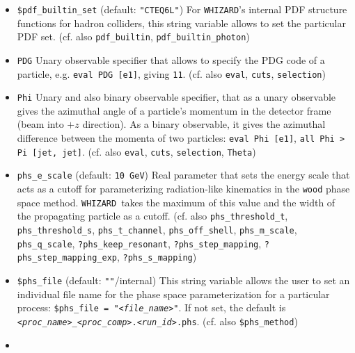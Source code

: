 \documentclass[12pt]{book}
\newcommand{\ttt}[1]{\texttt{#1}}
\newcommand{\whizard}{\texttt{WHIZARD}}
\begin{document}
\begin{itemize}
\ttt{pdf\_builtin\_photon} \newline
This is a beams specifier for \whizard's internal PDF structure
functions to integrate processes in hadron collisions with a photon as
initializer of the hard scattering process.
(cf. \ttt{beams}, \ttt{\$pdf\_builtin\_file}) 
\item
\ttt{\$pdf\_builtin\_set} \qquad (default: \ttt{"CTEQ6L"}) \newline 
For \whizard's internal PDF structure functions for hadron colliders,
this string variable allows to set the particular PDF set. (cf. also
\ttt{pdf\_builtin}, \ttt{pdf\_builtin\_photon})
\item
\ttt{PDG} \newline
Unary observable specifier that allows to specify the PDG code of a
particle, e.g. \ttt{eval PDG [e1]}, giving \ttt{11}. (cf. also
\ttt{eval}, \ttt{cuts}, \ttt{selection})
\item
\ttt{Phi} \newline
Unary and also binary observable specifier, that as a unary observable
gives the azimuthal angle of a particle's momentum in the detector
frame (beam into $+z$ direction). As a binary observable, it gives the
azimuthal difference between the momenta of two particles: \ttt{eval
Phi [e1]},  \ttt{all Phi > Pi [jet, jet]}. (cf. also \ttt{eval},
\ttt{cuts}, \ttt{selection}, \ttt{Theta}) 
\item
\ttt{phs\_e\_scale} \qquad (default: \ttt{10 GeV}) \newline
Real parameter that sets the energy scale that acts as a cutoff for
parameterizing radiation-like kinematics in the \ttt{wood} phase space
method. \whizard\ takes the maximum of this value and the width of the
propagating particle as a cutoff. (cf. also \ttt{phs\_threshold\_t},
\ttt{phs\_threshold\_s}, \ttt{phs\_t\_channel}, \ttt{phs\_off\_shell}, 
\ttt{phs\_m\_scale}, \ttt{phs\_q\_scale},
\newline \ttt{?phs\_keep\_resonant}, \ttt{?phs\_step\_mapping},
\ttt{?phs\_step\_mapping\_exp}, 
\ttt{?phs\_s\_mapping}) 
\item
\ttt{\$phs\_file} \qquad (default: \ttt{""}/internal) \newline
This string variable allows the user to set an individual file name
for the phase space parameterization for a particular process:
\ttt{\$phs\_file = "{\em <file\_name>}"}. If not set, the default is 
\ttt{{\em <proc\_name>}\_{\em <proc\_comp>}.{\em <run\_id>}.phs}. (cf. also
\ttt{\$phs\_method})
\item

\end{itemize}
\end{document}
